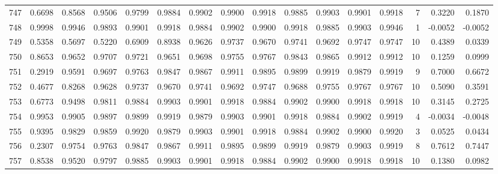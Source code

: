 \begin{tabular}{lrrrrrrrrrrrrrrr}
747 &      0.6698 &  0.8568 &  0.9506 &  0.9799 &  0.9884 &  0.9902 &  0.9900 &  0.9918 &  0.9885 &  0.9903 &   0.9901 &     0.9918 &      7 &                    0.3220 &                     0.1870 \\
748 &      0.9998 &  0.9946 &  0.9893 &  0.9901 &  0.9918 &  0.9884 &  0.9902 &  0.9900 &  0.9918 &  0.9885 &   0.9903 &     0.9946 &      1 &                   -0.0052 &                    -0.0052 \\
749 &      0.5358 &  0.5697 &  0.5220 &  0.6909 &  0.8938 &  0.9626 &  0.9737 &  0.9670 &  0.9741 &  0.9692 &   0.9747 &     0.9747 &     10 &                    0.4389 &                     0.0339 \\
750 &      0.8653 &  0.9652 &  0.9707 &  0.9721 &  0.9651 &  0.9698 &  0.9755 &  0.9767 &  0.9843 &  0.9865 &   0.9912 &     0.9912 &     10 &                    0.1259 &                     0.0999 \\
751 &      0.2919 &  0.9591 &  0.9697 &  0.9763 &  0.9847 &  0.9867 &  0.9911 &  0.9895 &  0.9899 &  0.9919 &   0.9879 &     0.9919 &      9 &                    0.7000 &                     0.6672 \\
752 &      0.4677 &  0.8268 &  0.9628 &  0.9737 &  0.9670 &  0.9741 &  0.9692 &  0.9747 &  0.9688 &  0.9755 &   0.9767 &     0.9767 &     10 &                    0.5090 &                     0.3591 \\
753 &      0.6773 &  0.9498 &  0.9811 &  0.9884 &  0.9903 &  0.9901 &  0.9918 &  0.9884 &  0.9902 &  0.9900 &   0.9918 &     0.9918 &     10 &                    0.3145 &                     0.2725 \\
754 &      0.9953 &  0.9905 &  0.9897 &  0.9899 &  0.9919 &  0.9879 &  0.9903 &  0.9901 &  0.9918 &  0.9884 &   0.9902 &     0.9919 &      4 &                   -0.0034 &                    -0.0048 \\
755 &      0.9395 &  0.9829 &  0.9859 &  0.9920 &  0.9879 &  0.9903 &  0.9901 &  0.9918 &  0.9884 &  0.9902 &   0.9900 &     0.9920 &      3 &                    0.0525 &                     0.0434 \\
756 &      0.2307 &  0.9754 &  0.9763 &  0.9847 &  0.9867 &  0.9911 &  0.9895 &  0.9899 &  0.9919 &  0.9879 &   0.9903 &     0.9919 &      8 &                    0.7612 &                     0.7447 \\
757 &      0.8538 &  0.9520 &  0.9797 &  0.9885 &  0.9903 &  0.9901 &  0.9918 &  0.9884 &  0.9902 &  0.9900 &   0.9918 &     0.9918 &     10 &                    0.1380 &                     0.0982 \\

\end{tabular}
